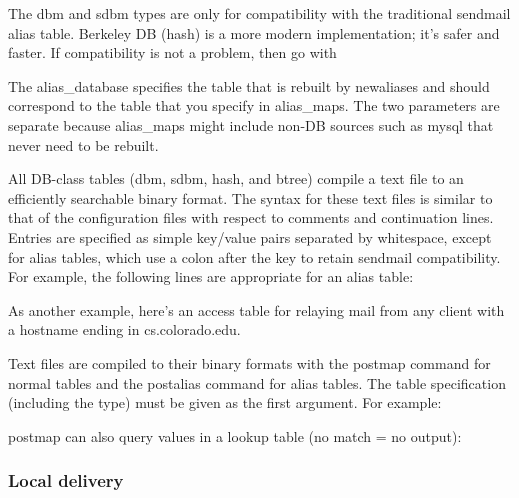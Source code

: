 
The {dbm} and {sdbm} types are only for compatibility with the
traditional {sendmail} alias table. Berkeley DB ({hash}) is a more
modern implementation; it's safer and faster. If compatibility is not a
problem, then go
with\protect\hypertarget{part0026_split_061.htmlux5cux23_idIndexMarker2713}{}{}\protect\hypertarget{part0026_split_061.htmlux5cux23_idIndexMarker2714}{}{}


The {alias\_database} specifies the table that is rebuilt by
\protect\hypertarget{part0026_split_061.htmlux5cux23_idIndexMarker2715}{}{}{newaliases}
and should correspond to the table that you specify in {alias\_maps}.
The two parameters are separate because {alias\_maps} might include
non-DB sources such as {mysql} that never need to be rebuilt.

All DB-class tables ({dbm}, {sdbm}, {hash}, and {btree}) compile a text
file to an {efficiently} searchable binary format. The syntax for these
text files is similar to that of the configuration files with respect to
comments and continuation lines. Entries are specified as simple
key/value pairs separated by whitespace, except for alias tables, which
use a colon after the key to retain {sendmail} compatibility. For
example, the following lines are appropriate for an alias table:


As another example, here's an access table for relaying mail from any
client with a hostname ending in cs.colorado.edu.


Text files are compiled to their binary formats with the {postmap}
command for normal tables and the {postalias} command for alias tables.
The table specification (including the type) must be given as the first
argument. For example:


{postmap} can also query values in a lookup table (no match = no
output):


\subsubsection[Local
delivery]{\texorpdfstring{\protect\hypertarget{part0026_split_061.htmlux5cux23_idTextAnchor1180}{}{}Local
delivery}{Local delivery}}

